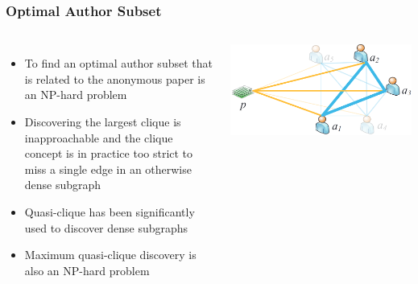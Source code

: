 \begin{frame}
\frametitle{Optimal Author Subset}
\begin{columns}

\begin{itemize}
    \item To find an optimal author subset that is related to the anonymous paper is an NP-hard problem
    \item Discovering the largest clique is inapproachable and the clique concept is in practice too strict to miss a single edge in an otherwise dense subgraph
    \item Quasi-clique has been significantly used to discover dense subgraphs
    \item Maximum quasi-clique discovery is also an NP-hard problem
\end{itemize}

\includegraphics[width=1\linewidth]{img/paper-ego-solved}


\end{columns}
\end{frame}
